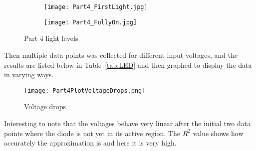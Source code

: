 \documentclass{article}
\begin{document}
\vspace{2em}


\begin{figure}[h]
    \centering
    \begin{subfigure}[t]{0.49\textwidth}
        \centering
        \texttt{[image: Part4\_FirstLight.jpg]}
        \label{fig:FirstLight}
    \end{subfigure}
    \hfill
    \begin{subfigure}[t]{0.49\textwidth}
        \centering
        \texttt{[image: Part4\_FullyOn.jpg]}
        \label{fig:Bright}
    \end{subfigure}
    \caption{Part 4 light levels}
    \label{fig:Part4States}
\end{figure}

Then multiple data points was collected for different input voltages, and the results are listed below in Table~\ref{tab:LED} and then graphed to display the data in varying ways.


\begin{table}[htbp]
  \centering
  \caption{LED values}
  \label{tab:LED}%
\end{table}

\clearpage


\begin{figure}[h]
\centering
\texttt{[image: Part4PlotVoltageDrops.png]}
\caption{Voltage drops}
\label{fig:part4voltage}
\end{figure}
Interesting to note that the voltages behave very linear after the initial two data points where the diode is not yet in its active region. The \(R^2\) value shows how accurately the approximation is and here it is very high.
\clearpage
\end{document}
